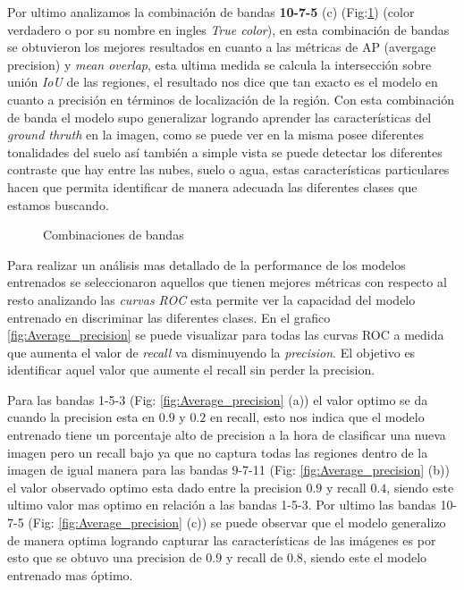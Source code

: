Por ultimo analizamos la combinación de bandas \textbf{10-7-5} (c) (Fig:\ref{fig:COMB_BANDAS}) (color verdadero o por su nombre en ingles \textit{True color}), en esta combinación de bandas se obtuvieron los mejores resultados en cuanto a las métricas de AP (avergage precision) y  \textit{mean overlap}, esta ultima medida se calcula la intersección sobre unión \textit{IoU} de las regiones, el resultado nos dice que tan exacto es el modelo en cuanto a precisión en términos de localización de la región. Con esta combinación de banda el modelo supo generalizar logrando aprender las características del \textit{ground thruth} en la imagen, como se puede ver en la misma posee diferentes tonalidades del suelo así también a simple vista se puede detectar los diferentes contraste que hay entre las nubes, suelo o agua, estas características particulares hacen que permita identificar de manera adecuada las diferentes clases que estamos buscando.

\begin{figure}[htbp]
\centering
{}
\caption{Combinaciones de bandas} \label{fig:COMB_BANDAS}
\end{figure}

Para realizar un análisis mas detallado de la performance de los modelos entrenados se seleccionaron aquellos que tienen mejores métricas con respecto al resto analizando las \textit{curvas ROC} esta permite ver la capacidad del modelo entrenado en discriminar las diferentes clases. En el grafico \ref{fig:Average_precision} se puede visualizar para todas las curvas ROC a medida que aumenta el valor de \textit{recall} va disminuyendo la \textit{precision}. El objetivo es identificar aquel valor que aumente el recall sin perder la precision.
\newpage

Para las bandas 1-5-3 (Fig: \ref{fig:Average_precision} (a)) el valor optimo se da cuando la precision esta en $0.9$ y $0.2$ en recall, esto nos indica que el modelo entrenado tiene un porcentaje alto de precision a la hora de clasificar una nueva imagen pero un recall bajo ya que no captura todas las regiones dentro de la imagen de igual manera para las bandas 9-7-11 (Fig: \ref{fig:Average_precision} (b)) el valor observado optimo esta dado entre la precision $0.9$ y recall $0.4$, siendo este ultimo valor mas optimo en relación a las bandas 1-5-3. Por ultimo las bandas 10-7-5 (Fig: \ref{fig:Average_precision} (c)) se puede observar que el modelo generalizo de manera optima logrando capturar las características de las imágenes es por esto que se obtuvo una precision de $0.9$ y recall  de $0.8$, siendo este el modelo entrenado mas óptimo. 

